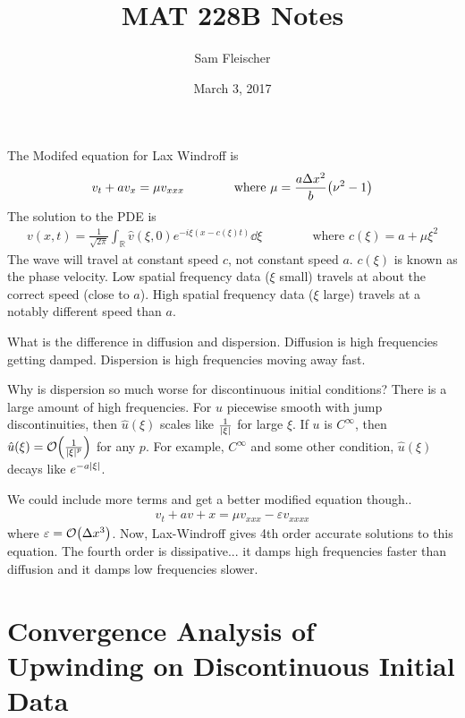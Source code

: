 \documentclass{article}
\title{MAT 228B Notes}
\author{Sam Fleischer}
\date{March 3, 2017}
\newcommand{\E}{\varepsilon}
\newcommand{\Dx}{\Delta x}
\begin{document}
    \maketitle

    The Modifed equation for Lax Windroff is
    \begin{align*}
        v_t + a v_x = \mu v_{xxx} \qquad \qquad \text{where } \mu = \frac{a\Dx^2}{b}\qty(\nu^2 - 1)
    \end{align*}
    The solution to the PDE is
    \begin{align*}
        v(x,t) = \frac{1}{\sqrt{2\pi}}\int_{\mathbb{R}}\hat{v}(\xi,0)e^{-i\xi(x - c(\xi)t)}\dd\xi \qquad\qquad \text{where } c(\xi) = a + \mu\xi^2
    \end{align*}
    The wave will travel at constant speed $c$, not constant speed $a$.  $c(\xi)$ is known as the phase velocity.  Low spatial frequency data ($\xi$ small) travels at about the correct speed (close to $a$).  High spatial frequency data ($\xi$ large) travels at a notably different speed than $a$.

    What is the difference in diffusion and dispersion.  Diffusion is high frequencies getting damped.  Dispersion is high frequencies moving away fast.

    Why is dispersion so much worse for discontinuous initial conditions?  There is a large amount of high frequencies.  For $u$ piecewise smooth with jump discontinuities, then $\hat{u}(\xi)$ scales like $\frac{1}{\abs{\xi}}$ for large $\xi$.  If $u$ is $C^\infty$, then $\hat{u}(\xi) = \order{\frac{1}{\abs{\xi}^p}}$ for any $p$.  For example, $C^\infty$ and some other condition, $\hat{u}(\xi)$ decays like $e^{-a\abs{\xi}}$.

    We could include more terms and get a better modified equation though..
    \begin{align*}
        v_t + av+x = \mu v_{xxx} - \E v_{xxxx}
    \end{align*}
    where $\E = \order{\Dx^3}$.  Now, Lax-Windroff gives 4th order accurate solutions to this equation.  The fourth order is dissipative... it damps high frequencies faster than diffusion and it damps low frequencies slower.

    \section{Convergence Analysis of Upwinding on Discontinuous Initial Data}
\end{document}
